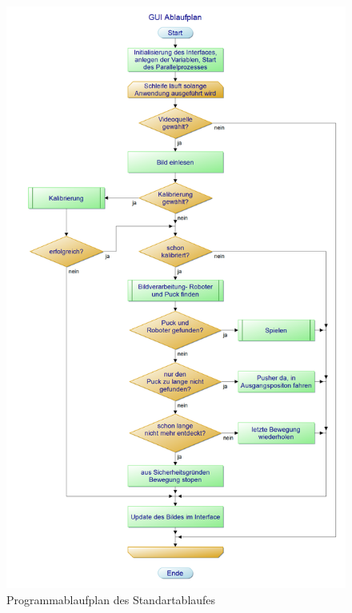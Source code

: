 \begin{figure}[h]
\includegraphics[scale =0.3]{images/gui_pap}
 \caption{Programmablaufplan des Standartablaufes}
 \label{gui_pap}

\end{figure}

\clearpage


